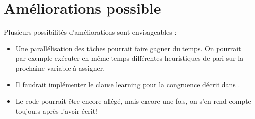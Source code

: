 \documentclass{article}
\begin{document}
\section{Améliorations possible}
Plusieurs possibilités d'améliorations sont envisageables : 
\begin{itemize}
\item Une parallélisation des tâches pourrait faire gagner du temps. On pourrait par exemple exécuter en même temps différentes heuristiques de pari sur la prochaine variable à assigner.
\item Il faudrait implémenter le clause learning pour la congruence décrit dans \cite{SMT}.
\item Le code pourrait être encore allégé, mais encore une fois, on s'en rend compte toujours après l'avoir écrit!
\end{itemize}



\end{document}
